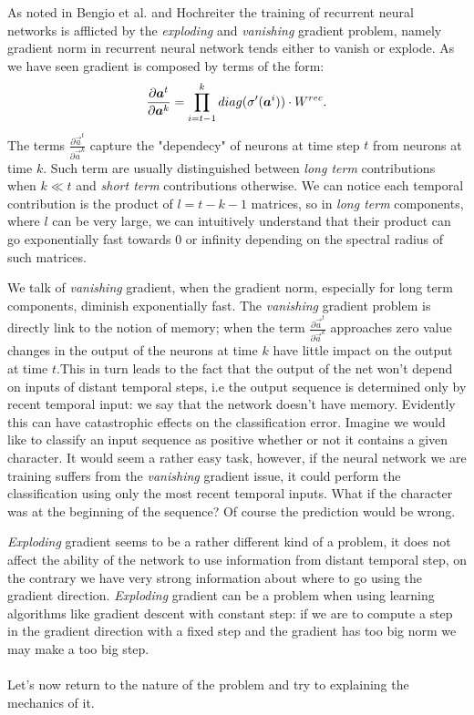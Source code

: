 As noted in Bengio et al.\cite{learningIsDifficult} and Hochreiter \cite{lstm}
the training of recurrent neural networks is afflicted by the \textit{exploding} and \textit{vanishing} gradient problem, namely gradient norm in recurrent neural network tends either to vanish or explode.
As we have seen gradient is composed by terms of the form:
\begin{equation}
\frac{\partial \boldsymbol{a}^t}{\partial \boldsymbol{a}^k} = \prod_{i=t-1}^{k}  diag(\sigma'(\boldsymbol{a}^i)) \cdot W^{rec}.
\label{eq:temporalComponent}
\end{equation}
The terms $\frac{\partial \vec{a}^t}{\partial \vec{a}^k}$ capture the "dependecy" of neurons at time step $t$ from neurons at time $k$.
Such term are usually distinguished between \textit{long term} contributions when $k\ll t$ and \textit{short term} contributions otherwise. We can notice each temporal contribution is the product of $l=t-k-1$ matrices, so in \textit{long term} components, where $l$ can be very large, we can intuitively understand that their product can go exponentially fast towards 0 or infinity depending on the spectral radius of such matrices.

We talk of \textit{vanishing} gradient, when the gradient norm, especially for long term components, diminish exponentially fast. The \textit{vanishing} gradient problem is directly link to the notion of memory; when the term $\frac{\partial \vec{a}^t}{\partial \vec{a}^k}$ approaches zero value changes in the output of the neurons at time $k$ have little impact on the output at time $t$.This in turn leads to the fact that the output of the net won't depend on inputs of distant temporal steps, i.e the output
sequence is determined only by recent temporal input: we say that the network doesn't have memory. Evidently this can have catastrophic effects on the classification error. Imagine we would like
to classify an input sequence as positive whether or not it contains a given character. It would seem a rather easy task, however, if the neural network
we are training suffers from the \textit{vanishing} gradient issue, it could perform the classification using only the most recent temporal inputs. What if the character was at the beginning of the sequence? Of course
the prediction would be wrong.

\textit{Exploding} gradient seems to be a rather different kind of a problem, it does not affect the ability of the network to use information from distant temporal step, on the contrary we have very strong information about where to go using the gradient direction. 
\textit{Exploding} gradient can be a problem when using learning algorithms like gradient descent with constant step: if we are to compute a step in the gradient direction with a fixed step and the gradient has too big norm we may make a too big step.
\\\\
Let's now return to the nature of the problem and try to explaining the mechanics of it.

